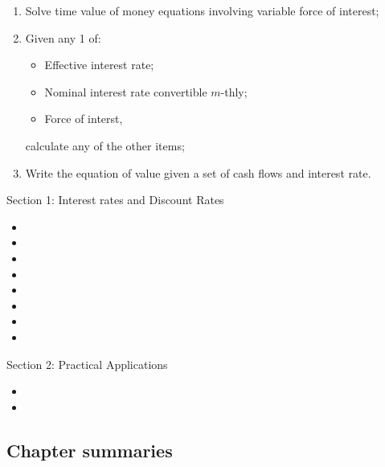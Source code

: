 \begin{outcomes}
\begin{enumerate}[label = \alph*)]
\begin{multicols*}{3}
		\begin{itemize}[leftmargin = *]
		\item	Interest rate;
		\item	Period of time;
		\item	Present value;
		\item	Current value;
		\item	Future value,
		\end{itemize}
		\end{multicols*}
		calculate the remaining item using \textit{simple} or \textit{compound} interest;
	\item[]	Solve time value of money equations involving variable force of interest;
	\item	Given any 1 of:
		\begin{itemize}[leftmargin = *]
		\item	Effective interest rate;
		\item	Nominal interest rate convertible $m$-thly;
		\item	Force of interst,
		\end{itemize}
		calculate any of the other items;
	\item	Write the equation of value given a set of cash flows and interest rate.
\end{enumerate}
\end{outcomes}

\begin{ASM_chapter}
Section 1: Interest rates and Discount Rates
\begin{itemize}
	\item	{}
	\item	{}
	\item	{}
	\item	{}
	\item	{}
	\item	{}
	\item	{}
	\item	{}
\end{itemize}
Section 2: Practical Applications
\begin{itemize}
	\item	{}
	\item	{}
\end{itemize}
\end{ASM_chapter}

\subsection{Chapter summaries}


